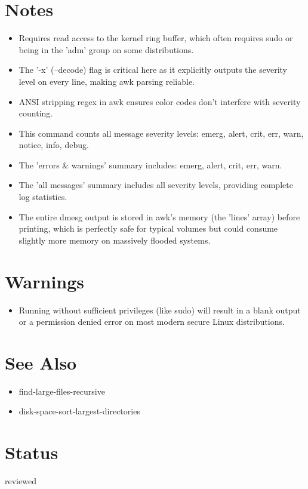 \documentclass{article}
\begin{document}
\section*{Notes}
\begin{itemize}
  \item Requires read access to the kernel ring buffer, which often requires sudo or being in the 'adm' group on some distributions.
  \item The '-x' (--decode) flag is critical here as it explicitly outputs the severity level on every line, making awk parsing reliable.
  \item ANSI stripping regex in awk ensures color codes don't interfere with severity counting.
  \item This command counts all message severity levels: emerg, alert, crit, err, warn, notice, info, debug.
  \item The 'errors \& warnings' summary includes: emerg, alert, crit, err, warn.
  \item The 'all messages' summary includes all severity levels, providing complete log statistics.
  \item The entire dmesg output is stored in awk's memory (the 'lines' array) before printing, which is perfectly safe for typical volumes but could consume slightly more memory on massively flooded systems.
\end{itemize}

\section*{Warnings}
\begin{itemize}
  \item Running without sufficient privileges (like sudo) will result in a blank output or a permission denied error on most modern secure Linux distributions.
\end{itemize}

\section*{See Also}
\begin{itemize}
  \item find-large-files-recursive
  \item disk-space-sort-largest-directories
\end{itemize}

\section*{Status}
reviewed
\end{document}

